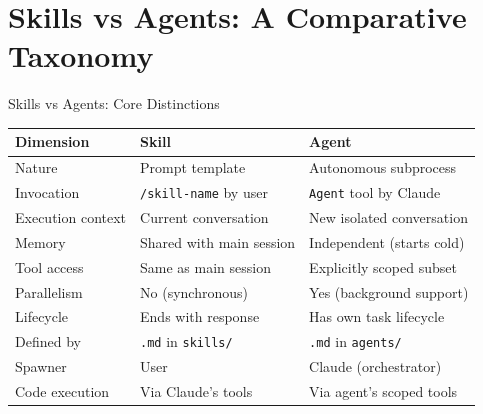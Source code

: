 \documentclass[aspectratio=169,xcolor=dvipsnames]{beamer}
\begin{document}
\section{Skills vs Agents: A Comparative Taxonomy}

\begin{frame}{Skills vs Agents: Core Distinctions}
    \begin{center}
    \begin{tabular}{@{}lll@{}}
        \toprule
        \textbf{Dimension}       & \textbf{Skill}                    & \textbf{Agent} \\
        \midrule
        Nature                   & Prompt template                   & Autonomous subprocess \\
        Invocation               & \texttt{/skill-name} by user      & \texttt{Agent} tool by Claude \\
        Execution context        & Current conversation              & New isolated conversation \\
        Memory                   & Shared with main session          & Independent (starts cold) \\
        Tool access              & Same as main session              & Explicitly scoped subset \\
        Parallelism              & No (synchronous)                  & Yes (background support) \\
        Lifecycle                & Ends with response                & Has own task lifecycle \\
        Defined by               & \texttt{.md} in \texttt{skills/}  & \texttt{.md} in \texttt{agents/} \\
        Spawner                  & User                              & Claude (orchestrator) \\
        Code execution           & Via Claude's tools                & Via agent's scoped tools \\
        \bottomrule
    \end{tabular}
    \end{center}
\end{frame}
\end{document}
